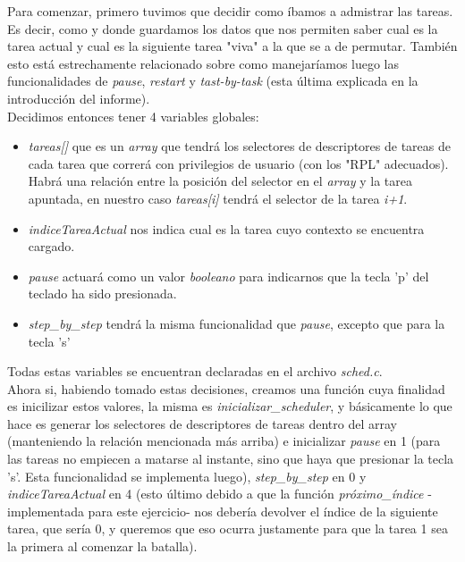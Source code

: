 Para comenzar, primero tuvimos que decidir como íbamos a admistrar las tareas. Es decir, como y donde guardamos los datos que nos permiten saber cual es la tarea actual y cual es la siguiente tarea "viva" a la que se a de permutar. También esto está estrechamente relacionado sobre como manejaríamos luego las funcionalidades de \textit{pause}, \textit{restart} y \textit{tast-by-task} (esta última explicada en la introducción del informe).\\

Decidimos entonces tener 4 variables globales:
\begin{itemize}
    \item \textit{tareas[]} que es un \textit{array} que tendrá los selectores de descriptores de tareas de cada tarea que correrá con privilegios de usuario (con los "RPL" adecuados). Habrá una relación entre la posición del selector en el \textit{array} y la tarea apuntada, en nuestro caso \textit{tareas[i]} tendrá el selector de la tarea \textit{i+1}.
    \item \textit{indiceTareaActual} nos indica cual es la tarea cuyo contexto se encuentra cargado.
    \item \textit{pause} actuará como un valor \textit{booleano} para indicarnos que la tecla 'p' del teclado ha sido presionada.
    \item \textit{step\_by\_step} tendrá la misma funcionalidad que \textit{pause}, excepto que para la tecla 's'
\end{itemize}

Todas estas variables se encuentran declaradas en el archivo \textit{sched.c}.\\

Ahora si, habiendo tomado estas decisiones, creamos una función cuya finalidad es inicilizar estos valores, la misma es \textit{inicializar\_scheduler}, y básicamente lo que hace es generar los selectores de descriptores de tareas dentro del array (manteniendo la relación mencionada más arriba) e inicializar \textit{pause} en 1 (para las tareas no empiecen a matarse al instante, sino que haya que presionar la tecla 's'. Esta funcionalidad se implementa luego), \textit{step\_by\_step} en 0 y \textit{indiceTareaActual} en 4 (esto último debido a que la función \textit{próximo\_índice} -implementada para este ejercicio- nos debería devolver el índice de la siguiente tarea, que sería 0, y queremos que eso ocurra justamente para que la tarea 1 sea la primera al comenzar la batalla).\\

